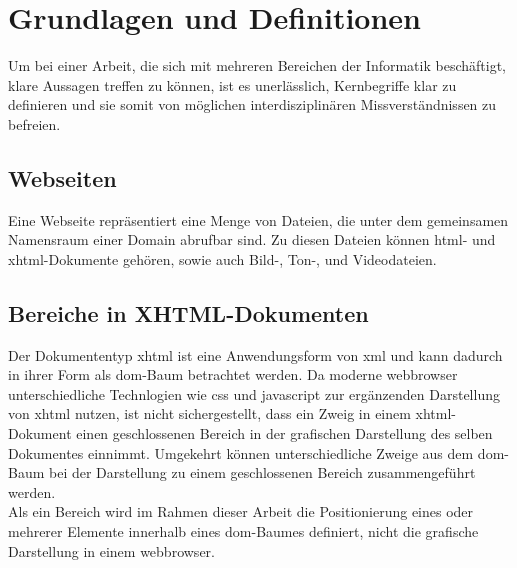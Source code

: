 
\chapter{Grundlagen und Definitionen}
\label{chp:GrundlagenDefinitionen}

Um bei einer Arbeit, die sich mit mehreren Bereichen der Informatik beschäftigt, klare Aussagen treffen zu können, ist es unerlässlich, Kernbegriffe klar zu
definieren und sie somit von möglichen interdisziplinären Missverständnissen zu befreien.

\section{Webseiten}
\label{sec:GrundlagenDefinitionen:Webseiten}
Eine Webseite repräsentiert eine Menge von Dateien, die unter dem gemeinsamen Namensraum einer Domain abrufbar sind. Zu diesen Dateien können \gls{html}- und
\gls{xhtml}-Dokumente gehören, sowie auch Bild-, Ton-, und Videodateien.

\section{Bereiche in XHTML-Dokumenten}
\label{sec:GrundlagenDefinitionen:BereicheXHTML}
Der Dokumententyp \gls{xhtml} ist eine Anwendungsform von \gls{xml}\cite{xhtml:w3c} und kann dadurch in ihrer Form als \gls{dom}-Baum betrachtet
werden\cite{xhtml:oreilly}. Da moderne \Gls{webbrowser} unterschiedliche Technlogien wie \gls{css} und \gls{javascript} zur ergänzenden Darstellung von
\gls{xhtml} nutzen, ist nicht sichergestellt, dass ein Zweig in einem \gls{xhtml}-Dokument einen geschlossenen Bereich in der grafischen Darstellung des
selben Dokumentes einnimmt. Umgekehrt können unterschiedliche Zweige aus dem \gls{dom}-Baum bei der Darstellung zu einem geschlossenen Bereich zusammengeführt
werden.\\

Als ein Bereich wird im Rahmen dieser Arbeit die Positionierung eines oder mehrerer Elemente innerhalb eines \gls{dom}-Baumes definiert, nicht die grafische
Darstellung in einem \gls{webbrowser}.

